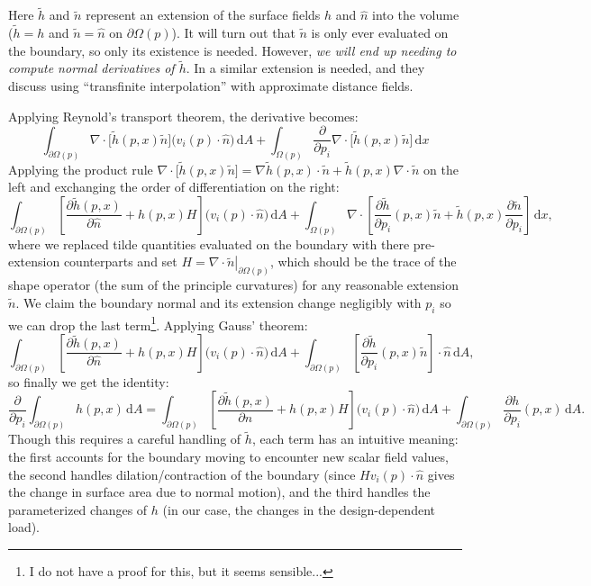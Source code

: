 \documentclass[10pt]{article}
\renewcommand{\div}{\nabla \cdot}
\providecommand{\shape}{\Omega(p)}
\providecommand{\boundary}{\partial \shape}
\providecommand{\vint}[1]{\int_{\shape} \! #1 \, \mathrm{d}x}
\providecommand{\sint}[1]{\int_{\boundary} \! #1 \, \mathrm{d}A}
\providecommand{\pder}[2]{\frac{\partial #1}{\partial #2}}
\providecommand{\evalat}[2]{\left.#1\right|_{#2}}
\begin{document}
\begin{appendices}
    Here $\tilde{h}$ and $\tilde{n}$ represent an extension of the surface
    fields $h$ and $\hat{n}$ into the volume ($\tilde{h} = h$ and $\tilde{n} =
    \hat{n}$ on $\boundary$). It will turn out that $\tilde{n}$
    is only ever evaluated on the boundary, so only its existence is needed.
    However, {\it we will end up needing to compute normal derivatives of
    $\tilde{h}$}. In \cite{chen2007shape} a similar extension is needed, and
    they discuss using ``transfinite interpolation'' with approximate distance
    fields.
    
    Applying Reynold's transport theorem, the derivative becomes:
    $$
    \sint{\div \big[\tilde{h}(p, x)\tilde{n} \big] \big( v_i(p) \cdot \hat{n} \big)}
+ \vint{\pder{}{p_i} \div \big[\tilde{h}(p, x)\tilde{n} \big]}
    $$
    Applying the product rule $\div \big[\tilde{h}(p, x)\tilde{n} \big] =
    \nabla \tilde{h}(p, x) \cdot \tilde{n} + \tilde{h}(p, x)\div \tilde{n}$ on
    the left and exchanging the order of differentiation on the right:
    $$
    \sint{\left[\pder{\tilde{h}(p, x)}{\hat{n}} + h(p, x) H \right]\big(v_i(p) \cdot \hat{n}\big)}
    + \vint{\div \left[\pder{\tilde{h}}{p_i}(p, x)\tilde{n} + \tilde{h}(p, x) \pder{\tilde{n}}{p_i} \right]},
    $$
    where we replaced tilde quantities evaluated on the boundary with there
    pre-extension counterparts and set $H = \evalat{\div \tilde{n}}{\boundary}$,
    which should be the trace of the shape operator (the sum of the principle
    curvatures) for any reasonable extension $\tilde{n}$. We claim the
    boundary normal and its extension change negligibly with $p_i$ so we can
    drop the last term\footnote{I do not have a proof for this, but it seems
    sensible...}. Applying Gauss' theorem:
    $$
    \sint{\left[\pder{\tilde{h}(p, x)}{\hat{n}} + h(p, x) H \right]\big(v_i(p) \cdot \hat{n}\big)}
    + \sint{\left[\pder{\tilde{h}}{p_i}(p, x)\tilde{n}\right] \cdot \hat{n}},
    $$
    so finally we get the identity:
    \begin{equation}
     \pder{}{p_i} \sint{h(p, x)} =
        \sint{\left[\pder{\tilde{h}(p, x)}{\hat{n}} + h(p, x) H \right]\big(v_i(p) \cdot \hat{n}\big)}
        + \sint{\pder{h}{p_i}(p, x)}.
        \label{eqn:surface_derivative}
    \end{equation}
    Though this requires a careful handling of $\tilde{h}$, each term has an
    intuitive meaning: the first accounts for the boundary moving to encounter
    new scalar field values, the second handles dilation/contraction of the
    boundary (since $H v_i(p) \cdot \hat{n}$ gives the change in surface area due to
    normal motion), and the third handles the parameterized changes of $h$ (in
    our case, the changes in the design-dependent load).


\end{appendices}
\end{document}
